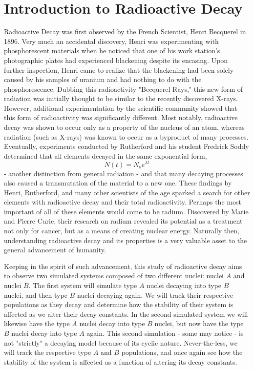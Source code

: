 \documentclass[twocolumn]{article}
\begin{document}
\section{Introduction to Radioactive Decay} 
\hspace{\parindent} Radioactive Decay was first observed by the French Scientist, Henri Becquerel in 1896. Very much an accidental discovery, Henri was experimenting with phosphorescent materials when he noticed that one of his work station's photographic plates had experienced blackening despite its encasing. Upon further inspection, Henri came to realize that the blackening had been solely caused by his samples of uranium and had nothing to do with the phosphorescence. Dubbing this radioactivity "Becquerel Rays," this new form of radiation was initially thought to be similar to the recently discovered X-rays. However, additional experimentation by the scientific community showed that this form of radioactivity was significantly different. Most notably, radioactive decay was shown to occur only as a property of the nucleus of an atom, whereas radiation (such as X-rays) was known to occur as a byproduct of many processes. Eventually, experiments conducted by Rutherford and his student Fredrick Soddy determined that all elements decayed in the same exponential form,
$$N(t)=N_oe^{\lambda t}$$
- another distinction from general radiation - and that many decaying processes also caused a transmutation of the material to a new one. These findings by Henri, Rutherford, and many other scientists of the age sparked a search for other elements with radioactive decay and their total radioactivity. Perhaps the most important of all of these elements would come to be radium. Discovered by Marie and Pierre Curie, their research on radium revealed its potential as a treatment not only for cancer, but as a means of creating nuclear energy. Naturally then, understanding radioactive decay and its properties is a very valuable asset to the general advancement of humanity.

Keeping in the spirit of such advancement, this study of radioactive decay aims to observe two simulated systems composed of two different nuclei: nuclei $A$ and nuclei $B$. The first system will simulate type $A$ nuclei decaying into type $B$ nuclei, and then type $B$ nuclei decaying again. We will track their respective populations as they decay and determine how the stability of their system is affected as we alter their decay constants. In the second simulated system we will likewise have the type $A$ nuclei decay into type $B$ nuclei, but now have the type $B$ nuclei decay into type $A$ again. This second simulation - some may notice - is not "strictly" a decaying model because of its cyclic nature. Never-the-less, we will track the respective type $A$ and $B$ populations, and once again see how the stability of the system is affected as a function of altering its decay constants.
%
\end{document}
